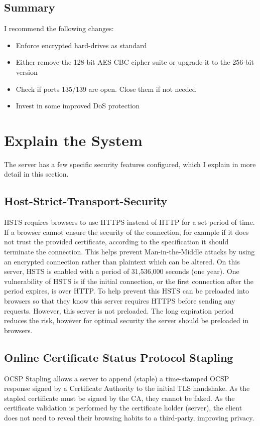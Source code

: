 \documentclass[12pt]{article}
\begin{document}
  \subsection{Summary}
  I recommend the following changes:
  \begin{itemize}
    \item Enforce encrypted hard-drives as standard
    \item Either remove the 128-bit AES CBC cipher suite or upgrade it to the 256-bit version
    \item Check if ports 135/139 are open. Close them if not needed
    \item Invest in some improved DoS protection
  \end{itemize}

  \section{Explain the System}

  The server has a few specific security features configured, which I explain in more detail in this section.

  \subsection{Host-Strict-Transport-Security}
  HSTS requires browsers to use HTTPS instead of HTTP for a set period of time.
  If a browser cannot ensure the security of the connection, for example if it does not trust the provided certificate, according to the specification it should terminate the connection.
  This helps prevent Man-in-the-Middle attacks by using an encrypted connection rather than plaintext which can be altered.
  On this server, HSTS is enabled with a period of 31,536,000 seconds (one year).
  One vulnerability of HSTS is if the initial connection, or the first connection after the period expires, is over HTTP.
  To help prevent this HSTS can be preloaded into browsers so that they know this server requires HTTPS before sending any requests.
  However, this server is not preloaded.
  The long expiration period reduces the risk, however for optimal security the server should be preloaded in browsers.

  \subsection{Online Certificate Status Protocol Stapling}
  OCSP Stapling allows a server to append (staple) a time-stamped OCSP response signed by a Certificate Authority to the initial TLS handshake.
  As the stapled certificate must be signed by the CA, they cannot be faked.
  As the certificate validation is performed by the certificate holder (server), the client does not need to reveal their browsing habits to a third-party, improving privacy.
\end{document}
